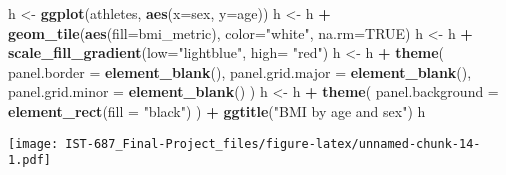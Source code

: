 \documentclass[]{article}
\newenvironment{Shaded}{\begin{snugshade}}{\end{snugshade}}
\newcommand{\DataTypeTok}[1]{\textcolor[rgb]{0.13,0.29,0.53}{#1}}
\newcommand{\KeywordTok}[1]{\textcolor[rgb]{0.13,0.29,0.53}{\textbf{#1}}}
\newcommand{\NormalTok}[1]{#1}
\newcommand{\OperatorTok}[1]{\textcolor[rgb]{0.81,0.36,0.00}{\textbf{#1}}}
\newcommand{\OtherTok}[1]{\textcolor[rgb]{0.56,0.35,0.01}{#1}}
\newcommand{\StringTok}[1]{\textcolor[rgb]{0.31,0.60,0.02}{#1}}
\begin{document}
\begin{Shaded}
\begin{Highlighting}[]
\NormalTok{h <-}\StringTok{ }\KeywordTok{ggplot}\NormalTok{(athletes, }\KeywordTok{aes}\NormalTok{(}\DataTypeTok{x=}\NormalTok{sex, }\DataTypeTok{y=}\NormalTok{age))}
\NormalTok{h <-}\StringTok{ }\NormalTok{h }\OperatorTok{+}\StringTok{ }\KeywordTok{geom_tile}\NormalTok{(}\KeywordTok{aes}\NormalTok{(}\DataTypeTok{fill=}\NormalTok{bmi_metric), }\DataTypeTok{color=}\StringTok{"white"}\NormalTok{, }\DataTypeTok{na.rm=}\OtherTok{TRUE}\NormalTok{)}
\NormalTok{h <-}\StringTok{ }\NormalTok{h }\OperatorTok{+}\StringTok{ }\KeywordTok{scale_fill_gradient}\NormalTok{(}\DataTypeTok{low=}\StringTok{"lightblue"}\NormalTok{, }\DataTypeTok{high=} \StringTok{"red"}\NormalTok{)}
\NormalTok{h <-}\StringTok{ }\NormalTok{h }\OperatorTok{+}\StringTok{ }\KeywordTok{theme}\NormalTok{(}
  \DataTypeTok{panel.border =} \KeywordTok{element_blank}\NormalTok{(),}
  \DataTypeTok{panel.grid.major =} \KeywordTok{element_blank}\NormalTok{(),}
  \DataTypeTok{panel.grid.minor =} \KeywordTok{element_blank}\NormalTok{()}
\NormalTok{)}
\NormalTok{h <-}\StringTok{ }\NormalTok{h }\OperatorTok{+}\StringTok{ }\KeywordTok{theme}\NormalTok{(}
  \DataTypeTok{panel.background =} \KeywordTok{element_rect}\NormalTok{(}\DataTypeTok{fill =} \StringTok{"black"}\NormalTok{)}
\NormalTok{) }\OperatorTok{+}\StringTok{ }\KeywordTok{ggtitle}\NormalTok{(}\StringTok{"BMI by age and sex"}\NormalTok{)}
\NormalTok{h}
\end{Highlighting}
\end{Shaded}

\texttt{[image: IST-687\_Final-Project\_files/figure-latex/unnamed-chunk-14-1.pdf]}
\end{document}
